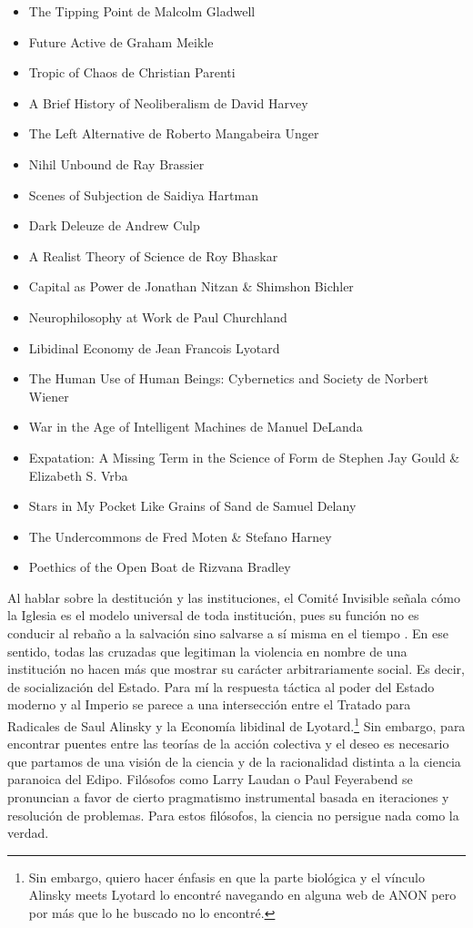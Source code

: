 \begin{itemize}
  \item The Tipping Point de Malcolm Gladwell
  \item Future Active de Graham Meikle
  \item Tropic of Chaos de Christian Parenti
  \item A Brief History of Neoliberalism de David Harvey
  \item The Left Alternative de Roberto Mangabeira Unger
  \item Nihil Unbound de Ray Brassier
  \item Scenes of Subjection de Saidiya Hartman
  \item Dark Deleuze de Andrew Culp
  \item A Realist Theory of Science de Roy Bhaskar
  \item Capital as Power de Jonathan Nitzan \& Shimshon Bichler
  \item Neurophilosophy at Work de Paul Churchland
  \item Libidinal Economy de Jean Francois Lyotard
  \item The Human Use of Human Beings: Cybernetics and Society de Norbert Wiener
  \item War in the Age of Intelligent Machines de Manuel DeLanda
  \item Expatation: A Missing Term in the Science of Form de Stephen Jay Gould \& Elizabeth S. Vrba
  \item Stars in My Pocket Like Grains of Sand de Samuel Delany
  \item The Undercommons de Fred Moten \& Stefano Harney
  \item Poethics of the Open Boat de Rizvana Bradley
\end{itemize}

Al hablar sobre la destitución y las instituciones, el Comité Invisible señala cómo la Iglesia es el modelo universal de toda institución, pues su función no es conducir al rebaño a la salvación sino salvarse a sí misma en el tiempo \autocite[p. 73]{comiteinvisibleAhora2017}. En ese sentido, todas las cruzadas que legitiman la violencia en nombre de una institución no hacen más que mostrar su carácter arbitrariamente social. Es decir, de socialización del Estado. Para mí la respuesta táctica al poder del Estado moderno y al Imperio se parece a una intersección entre el Tratado para Radicales de Saul Alinsky y la Economía libidinal de Lyotard.\footnote{Sin embargo, quiero hacer énfasis en que la parte biológica y el vínculo Alinsky meets Lyotard lo encontré navegando en alguna web de ANON pero por más que lo he buscado no lo encontré.} Sin embargo, para encontrar puentes entre las teorías de la acción colectiva y el deseo es necesario que partamos de una visión de la ciencia y de la racionalidad distinta a la ciencia paranoica del Edipo. Filósofos como Larry Laudan o Paul Feyerabend se pronuncian a favor de cierto pragmatismo instrumental basada en iteraciones y resolución de problemas. Para estos filósofos, la ciencia no persigue nada como la verdad.

